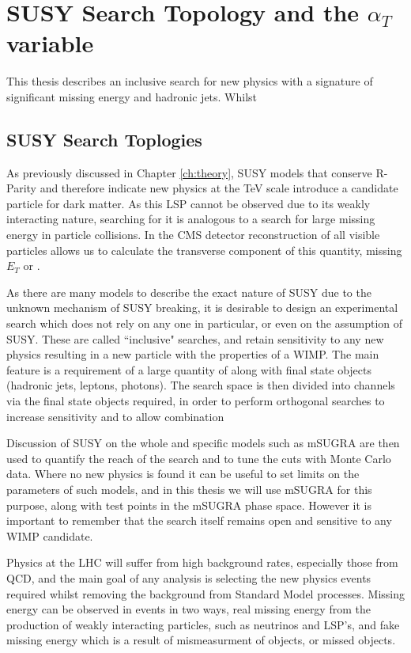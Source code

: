 \chapter{SUSY Search Topology and the $\alpha_{T}$  variable}
\cite{PRL1fb}
\cite{DawsonSearch}
\cite{1fbnote}
\cite{aTHTdepstuart}

This thesis describes an inclusive search for new physics with a signature of significant missing energy and hadronic jets. Whilst 


\section{SUSY Search Toplogies}

As previously discussed in Chapter \ref{ch:theory}, SUSY models that conserve R-Parity and therefore indicate new physics at the TeV scale introduce a candidate particle for dark matter. As this LSP cannot be observed due to its weakly interacting nature, searching for it is analogous to a search for large missing energy in particle collisions. In the CMS detector reconstruction of all visible particles allows us to calculate the transverse component of this quantity, missing $E_{T}$ or \met. 

As there are many models to describe the exact nature of SUSY due to the unknown mechanism of SUSY breaking, it is desirable to design an experimental search which does not rely on any one in particular, or even on the assumption of SUSY. These are called ``inclusive" searches, and retain sensitivity to any new physics resulting in a new particle with the properties of a WIMP. The main feature is a requirement of a large quantity of \met along with final state objects (hadronic jets, leptons, photons). The search space is then divided into channels via the final state objects required, in order to perform orthogonal searches to increase sensitivity and to allow combination 

Discussion of SUSY on the whole and specific models such as mSUGRA are then used to quantify the reach of the search and to tune the cuts with Monte Carlo data. Where no new physics is found it can be useful to set limits on the parameters of such models, and in this thesis we will use mSUGRA for this purpose, along with test points in the mSUGRA phase space. However it is important to remember that the search itself remains open and sensitive to any WIMP candidate. 

Physics at the LHC will suffer from high background rates, especially those from QCD, and the main goal of any analysis is selecting the new physics events required whilst removing the background from Standard Model processes. Missing energy can be observed in events in two ways, real missing energy from the production of weakly interacting particles, such as neutrinos and LSP's, and fake missing energy which is a result of mismeasurment of objects, or missed objects. 

